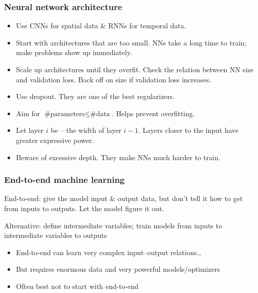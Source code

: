 \begin{frame}
    \frametitle{Neural network architecture}
    
    \hfill
    
    \hfill
    
    \hfill
    

    \begin{itemize}[<+->]
        \item \alert{Use CNNs for spatial data \& RNNs for temporal data.}
        \item \alert{Start with architectures that are too small.}
        NNs take a long time to train; make problems show up immediately.
        \item \alert{Scale up architectures until they overfit.}
        Check the relation between NN size and validation loss.
        Back off on size if validation loss increases.
        \item \alert{Use dropout.}
        They are one of the best regularizers.
        \item \alert{Aim for $\text{\# parameters} \le \text{\# data}$.}
        Helps prevent overfitting.
        \item \alert{Let layer $i$ be -- the width of layer $i - 1$.}
        Layers closer to the input have greater expressive power.
        \item \alert{Beware of excessive depth.}
        They make NNs much harder to train.
    \end{itemize}
\end{frame}

\begin{frame}
    \frametitle{End-to-end machine learning}

    \begin{block}{}
        \alert{End-to-end}: give the model input \& output data, but don't tell it how to get from inputs to outputs.
        Let the model figure it out.
    \end{block}

    \begin{center}
        
    \end{center}
    \pause

    \begin{block}{}
        Alternative: define intermediate variables; train models from inputs to intermediate variables to outputs
    \end{block}

    \begin{center}
        
    \end{center}
    \pause

    \begin{itemize}
        \item End-to-end can learn very complex input--output relations\ldots
        \item But requires enormous data and very powerful models/optimizers
        \item Often best not to start with end-to-end
    \end{itemize}
\end{frame}

